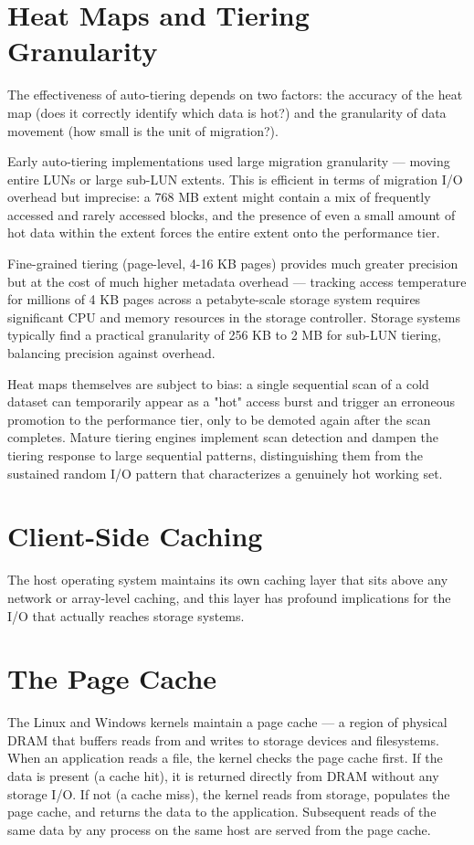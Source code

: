\section{Heat Maps and Tiering Granularity}
The effectiveness of auto-tiering depends on two factors: the accuracy of the heat map (does it correctly identify which data is hot?) and the granularity of data movement (how small is the unit of migration?).

Early auto-tiering implementations used large migration granularity --- moving entire LUNs or large sub-LUN extents. This is efficient in terms of migration I/O overhead but imprecise: a 768 MB extent might contain a mix of frequently accessed and rarely accessed blocks, and the presence of even a small amount of hot data within the extent forces the entire extent onto the performance tier.

Fine-grained tiering (page-level, 4-16 KB pages) provides much greater precision but at the cost of much higher metadata overhead --- tracking access temperature for millions of 4 KB pages across a petabyte-scale storage system requires significant CPU and memory resources in the storage controller. Storage systems typically find a practical granularity of 256 KB to 2 MB for sub-LUN tiering, balancing precision against overhead.

Heat maps themselves are subject to bias: a single sequential scan of a cold dataset can temporarily appear as a "hot" access burst and trigger an erroneous promotion to the performance tier, only to be demoted again after the scan completes. Mature tiering engines implement scan detection and dampen the tiering response to large sequential patterns, distinguishing them from the sustained random I/O pattern that characterizes a genuinely hot working set.

\section{Client-Side Caching}
The host operating system maintains its own caching layer that sits above any network or array-level caching, and this layer has profound implications for the I/O that actually reaches storage systems.

\section{The Page Cache}
The Linux and Windows kernels maintain a page cache --- a region of physical DRAM that buffers reads from and writes to storage devices and filesystems. When an application reads a file, the kernel checks the page cache first. If the data is present (a cache hit), it is returned directly from DRAM without any storage I/O. If not (a cache miss), the kernel reads from storage, populates the page cache, and returns the data to the application. Subsequent reads of the same data by any process on the same host are served from the page cache.

